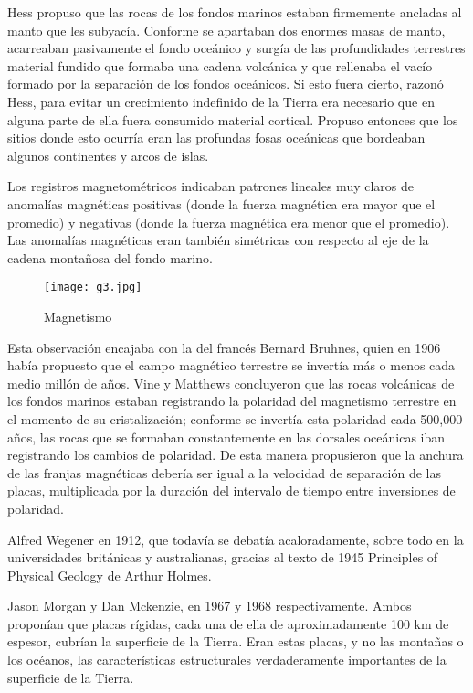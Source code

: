Hess propuso que las rocas de los fondos marinos estaban firmemente ancladas al manto que les subyacía. Conforme se apartaban dos enormes masas de manto, acarreaban pasivamente el fondo oceánico y surgía de las profundidades terrestres material fundido que formaba una cadena volcánica y que rellenaba el vacío formado por la separación de los fondos oceánicos. Si esto fuera cierto, razonó Hess, para evitar un crecimiento indefinido de la Tierra era necesario que en alguna parte de ella fuera consumido material cortical. Propuso entonces que los sitios donde esto ocurría eran las profundas fosas oceánicas que bordeaban algunos continentes y arcos de islas.

Los registros magnetométricos indicaban patrones lineales muy claros de anomalías magnéticas positivas (donde la fuerza magnética era mayor que el promedio) y negativas (donde la fuerza magnética era menor que el promedio). Las anomalías magnéticas eran también simétricas con respecto al eje de la cadena montañosa del fondo marino.
\begin{figure}[h!]
\centering
  \texttt{[image: g3.jpg]}
  \caption{Magnetismo}
  \label{g3}
\end{figure}
Esta observación encajaba con la del francés Bernard Bruhnes, quien en 1906 había propuesto que el campo magnético terrestre se invertía más o menos cada medio millón de años. Vine y Matthews concluyeron que las rocas volcánicas de los fondos marinos estaban registrando la polaridad del magnetismo terrestre en el momento de su cristalización; conforme se invertía esta polaridad cada 500,000 años, las rocas que se formaban constantemente en las dorsales oceánicas iban registrando los cambios de polaridad. De esta manera propusieron que la anchura de las franjas magnéticas debería ser igual a la velocidad de separación de las placas, multiplicada por la duración del intervalo de tiempo entre inversiones de polaridad.

Alfred Wegener en 1912, que todavía se debatía acaloradamente, sobre todo en la universidades británicas y australianas, gracias al texto de 1945 Principles of Physical Geology de Arthur Holmes.

Jason Morgan y Dan Mckenzie, en 1967 y 1968 respectivamente. Ambos proponían que placas rígidas, cada una de ella de aproximadamente 100 km de espesor, cubrían la superficie de la Tierra. Eran estas placas, y no las montañas o los océanos, las características estructurales verdaderamente importantes de la superficie de la Tierra.

